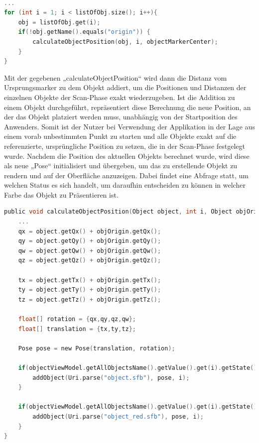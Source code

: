 \\ 
\linebreak
\begin{lstlisting}[language=C,
    frame=lines,           % Ein Rahmen um den Code (single for box, lines for top and bottom)
    xleftmargin=\parindent,  % Rahmen link von den Zahlen
    style=algoBericht,
    label={code:listOfObjects},
    captionpos=b,           % Caption unter den Code setzen
caption={Abfolge der Objekte in der Liste}]
... 
for (int i = 1; i < listOfObj.size(); i++){
    obj = listOfObj.get(i);
    if(!obj.getName().equals("origin")) {
        calculateObjectPosition(obj, i, objectMarkerCenter);
    }
}
\end{lstlisting}
Mit der gegebenen „calculateObjectPosition“ wird dann die Distanz vom Ursprungsmarker zu dem Objekt addiert, um 
die Positionen und Distanzen der einzelnen Objekte der Scan-Phase exakt wiederzugeben. Ist die Addition zu einem Objekt durchgeführt, repräsentiert diese 
Berechnung die neue Position, an der das Objekt platziert werden muss, unabhängig von der Startposition des Anwenders. Somit ist der Nutzer bei Verwendung der 
Applikation in der Lage aus einem vorab unbestimmten Punkt zu starten und alle Objekte exakt auf die referenzierte, ursprüngliche Position zu setzen, die 
in der Scan-Phase festgelegt wurde. Nachdem die Position des aktuellen Objekts berechnet wurde, wird diese als neue „Pose“ initialisiert und übergeben, um 
das zu erstellende Objekt zu rendern und auf der Oberfläche anzuzeigen. Dabei findet eine Abfrage statt, um welchen Status es sich handelt, um daraufhin 
entscheiden zu können in welcher Farbe das Objekt zu Präsentieren ist.  
\\ 
\linebreak
\begin{lstlisting}[language=C,
    frame=lines,           % Ein Rahmen um den Code (single for box, lines for top and bottom)
    xleftmargin=\parindent,  % Rahmen link von den Zahlen
    style=algoBericht,
    label={code:additionOfObject},
    captionpos=b,           % Caption unter den Code setzen
caption={Berechnung der Markerplatzierung}]
public void calculateObjectPosition(Object object, int i, Object objOrigin){
    ... 
    qx = object.getQx() + objOrigin.getQx();
    qy = object.getQy() + objOrigin.getQy();
    qw = object.getQw() + objOrigin.getQw();
    qz = object.getQz() + objOrigin.getQz();

    tx = object.getTx() + objOrigin.getTx();
    ty = object.getTy() + objOrigin.getTy();
    tz = object.getTz() + objOrigin.getTz();

    float[] rotation = {qx,qy,qz,qw};
    float[] translation = {tx,ty,tz};

    Pose pose = new Pose(translation, rotation);

    if(objectViewModel.getAllObjectsName().getValue().get(i).getState() == 1) {
        addObject(Uri.parse("object.sfb"), pose, i);
    }

    if(objectViewModel.getAllObjectsName().getValue().get(i).getState() == -1){
        addObject(Uri.parse("object_red.sfb"), pose, i);
    }
}
\end{lstlisting}
